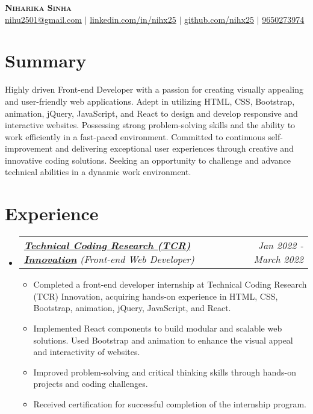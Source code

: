 \documentclass[letterpaper,11pt]{article}
\makeatletter
\newcommand{\resumeItem}[1]{
  \item\small{
    {#1 \vspace{-2pt}}
  }
}
\newcommand{\resumeSubSubheading}[2]{
    \item
    \begin{tabular*}{0.97\textwidth}{l@{\extracolsep{\fill}}r}
      \textit{\small#1} & \textit{\small #2} \\
    \end{tabular*}\vspace{-7pt}
}
\newcommand{\resumeSubHeadingListStart}{\begin{itemize}[leftmargin=0.15in, label={}]}
\newcommand{\resumeSubHeadingListEnd}{\end{itemize}}
\newcommand{\resumeItemListStart}{\begin{itemize}}
\newcommand{\resumeItemListEnd}{\end{itemize}\vspace{-5pt}}
\makeatother
\begin{document}

\begin{center}
    \textbf{\Huge \scshape Niharika Sinha} \\ \vspace{1pt}
    \href{mailto:nihu2501@gmail.com}{\underline{nihu2501@gmail.com}} $|$  
    \href{https://linkedin.com/in/nihx25}{\underline{linkedin.com/in/nihx25}} $|$
    \href{https://github.com/nihx25}{\underline{github.com/nihx25}} $|$
    \href{tel:+919650273974} {\underline{9650273974}}
    
\end{center}

\section{Summary}
{Highly driven Front-end Developer with a passion for creating visually appealing and user-friendly web applications. Adept in utilizing HTML, CSS, Bootstrap, animation, jQuery, JavaScript, and React to design and develop responsive and interactive websites. Possessing strong problem-solving skills and the ability to work efficiently in a fast-paced environment. Committed to continuous self-improvement and delivering exceptional user experiences through creative and innovative coding solutions. Seeking an opportunity to challenge and advance technical abilities in a dynamic work environment.}

\section{Experience}
  \resumeSubHeadingListStart
   \resumeSubSubheading
    {\textbf{\href{https://verification.givemycertificate.com/v/94bfc238-5031-4eaa-8a45-5e6355310612}{Technical Coding Research (TCR) Innovation}} (Front-end Web Developer) }{Jan 2022 - March 2022}
    \resumeItemListStart
       \resumeItem{Completed a front-end developer internship at Technical Coding Research (TCR) Innovation, acquiring hands-on experience in HTML, CSS, Bootstrap, animation, jQuery, JavaScript, and React.}
       \resumeItem{Implemented React components to build modular and scalable web solutions. Used Bootstrap and animation to enhance the visual appeal and interactivity of websites.}
       \resumeItem{Improved problem-solving and critical thinking skills through hands-on projects and coding challenges.}
       \resumeItem{Received certification for successful completion of the internship program.}
    \resumeItemListEnd
   \resumeSubHeadingListEnd
\end{document}
